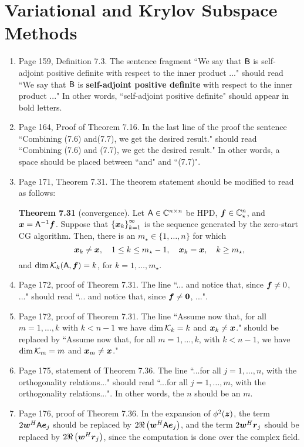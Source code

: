 \documentclass{book}
\begin{document}
\begin{enumerate}
	\end{enumerate}
	
	\chapter{Variational and Krylov Subspace Methods}
	
	\begin{enumerate}
	\item
Page 159, Definition 7.3. The sentence fragment ``We say that $\mathsf{B}$ is self-adjoint positive definite with respect to the inner product ..." should read ``We say that $\mathsf{B}$ is \textbf{self-adjoint positive definite} with respect to the inner product ..." In other words, ``self-adjoint positive definite" should appear in bold letters.

	\item
Page 164, Proof of Theorem 7.16. In the last line of the proof the sentence ``Combining (7.6) and(7.7), we get the desired result." should read ``Combining (7.6) and (7.7), we get the desired result." In other words, a space should be placed between ``and" and ``(7.7)".

	\item
Page 171, Theorem 7.31. The theorem statement should be modified to read as follows:

\textbf{Theorem 7.31} (convergence). Let $\mathsf{A}\in\mathbb C^{n\times n}$ be HPD, $\boldsymbol{f}\in \mathbb C^n_\star$, and $\boldsymbol{x} = \mathsf{A}^{-1}\boldsymbol{f}$. Suppose that $\left\{ \boldsymbol{x}_k \right\}_{k = 1}^\infty$ is the sequence generated by the zero-start CG algorithm. Then, there is an $m_\star\in\{1,\ldots , n\}$ for which
	\[
\boldsymbol{x}_k\ne \boldsymbol{x}, \quad 1\le k \le m_\star-1, \quad \boldsymbol{x}_k = \boldsymbol{x}, \quad k\ge m_\star,
	\] 
and $\dim {\mathcal K}_k(\mathsf{A},\boldsymbol{f}) = k$, for $k = 1, \ldots, m_\star$.

	\item
Page 172, proof of Theorem 7.31. The line ``... and notice that, since $\boldsymbol{f}\ne 0$, ..." should read ``... and notice that, since $\boldsymbol{f}\ne {\bf 0}$, ...".

	\item
Page 172, proof of Theorem 7.31. The line ``Assume now that, for all $m = 1, \ldots, k$ with $k < n-1$ we have $\dim {\mathcal K}_k = k$ and $\boldsymbol{x}_k \neq \boldsymbol{x}$." should be replaced by ``Assume now that, for all $m = 1, \ldots, k$, with $k < n-1$, we have $\dim {\mathcal K}_m = m$ and $\boldsymbol{x}_m \neq \boldsymbol{x}$."

	\item
Page 175, statement of Theorem 7.36. The line ``...for all $j = 1, \ldots, n$, with the orthogonality relations..." should read ``...for all $j = 1, \ldots, m$, with the orthogonality relations...". In other words, the $n$ should be an $m$.


	\item
Page 176, proof of Theorem 7.36. In the expansion of $\phi^2(\boldsymbol{z})$, the term $2\boldsymbol{w}^H\mathsf{A}\boldsymbol{e}_j$ should be replaced by $2\Re\left(\boldsymbol{w}^H\mathsf{A}\boldsymbol{e}_j\right)$, and the term $2\boldsymbol{w}^H\boldsymbol{r}_j$ should be replaced by $2\Re\left(\boldsymbol{w}^H\boldsymbol{r}_j\right)$, since the computation is done over the complex field.


	\end{enumerate}
	
\end{document}
